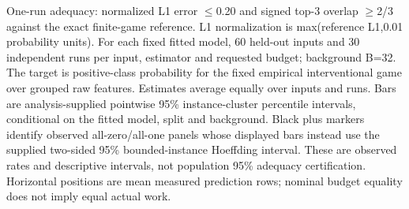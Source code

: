 One-run adequacy: normalized L1 error $\leq$0.20 and signed top-3 overlap $\geq$2/3 against the exact finite-game reference. L1 normalization is max(reference L1,0.01 probability units). For each fixed fitted model, 60 held-out inputs and 30 independent runs per input, estimator and requested budget; background B=32. The target is positive-class probability for the fixed empirical interventional game over grouped raw features. Estimates average equally over inputs and runs. Bars are analysis-supplied pointwise 95\% instance-cluster percentile intervals, conditional on the fitted model, split and background. Black plus markers identify observed all-zero/all-one panels whose displayed bars instead use the supplied two-sided 95\% bounded-instance Hoeffding interval. These are observed rates and descriptive intervals, not population 95\% adequacy certification. Horizontal positions are mean measured prediction rows; nominal budget equality does not imply equal actual work.
